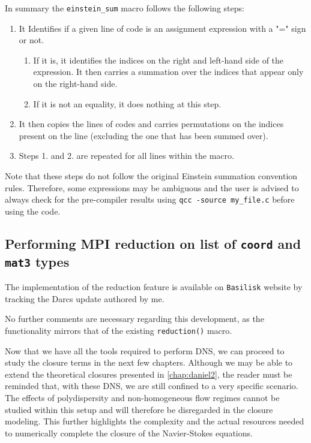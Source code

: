 In summary the \texttt{einstein\_sum} macro follows the following steps:
\begin{enumerate}
    \item  It Identifies if a given line of code is an assignment expression with a "=" sign or not. 
    \begin{enumerate}
    \item If it is, it identifies the indices on the right and left-hand side of the expression. 
       It then carries a summation over the indices that appear only on the right-hand side. 
    \item If it is not an equality, it does nothing at this step. 
    \end{enumerate}
    \item  It then copies the lines of codes and carries permutations on the indices present on the line (excluding the one that has been summed over). 
    \item Steps 1. and 2. are repeated for all lines within the macro. 
\end{enumerate}
Note that these steps do not follow the original Einstein summation convention rules. 
Therefore, some expressions may be ambiguous and the user is advised to always check for the pre-compiler results using \texttt{qcc -source my\_file.c} before using the code.

\subsection{Performing  MPI reduction on list of \texttt{coord} and \texttt{mat3} types}

The implementation of the reduction feature is available on \texttt{Basilisk} website by tracking the Darcs update authored by me.

No further comments are necessary regarding this development, as the functionality mirrors that of the existing \texttt{reduction()} macro.




Now that we have all the tools required to perform DNS, we can proceed to study the closure terms in the next few chapters. Although we may be able to extend the theoretical closures presented in \ref{chap:daniel2}, the reader must be reminded that, with these DNS, we are still confined to a very specific scenario. 
The effects of polydispersity and non-homogeneous flow regimes cannot be studied within this setup and will therefore be disregarded in the closure modeling. 
This further highlights the complexity and the actual resources needed to numerically complete the closure of the Navier-Stokes equations.





